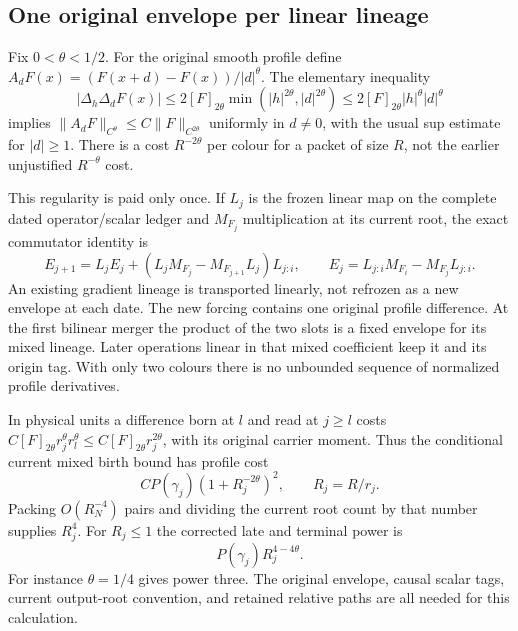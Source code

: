 \subsection{One original envelope per linear lineage}

Fix $0<\theta<1/2$.  For the original smooth profile define
$A_dF(x)=(F(x+d)-F(x))/|d|^\theta$.  The elementary inequality
\begin{equation}
 |\Delta_h\Delta_dF(x)|\leq
 2[F]_{2\theta}\min(|h|^{2\theta},|d|^{2\theta})
 \leq2[F]_{2\theta}|h|^\theta|d|^\theta
 \label{ha:holder-double}
\end{equation}
implies $\|A_dF\|_{C^\theta}\leq C\|F\|_{C^{2\theta}}$ uniformly in
$d\ne0$, with the usual sup estimate for $|d|\geq1$.  There is a cost
$R^{-2\theta}$ per colour for a packet of size $R$, not the earlier
unjustified $R^{-\theta}$ cost.

This regularity is paid only once.  If $L_j$ is the frozen linear map on
the complete dated operator/scalar ledger and $M_{F_j}$ multiplication
at its current root, the exact commutator identity is
\begin{equation}
 E_{j+1}=L_jE_j+
       (L_jM_{F_j}-M_{F_{j+1}}L_j)L_{j:i},
 \qquad E_j=L_{j:i}M_{F_i}-M_{F_j}L_{j:i}.
 \label{ha:fixed-lineage}
\end{equation}
An existing gradient lineage is transported linearly, not refrozen as a
new envelope at each date.  The new forcing contains one original
profile difference.  At the first bilinear merger the product of the
two slots is a fixed envelope for its mixed lineage.  Later operations
linear in that mixed coefficient keep it and its origin tag.  With
only two colours there is no unbounded sequence of normalized profile
derivatives.

In physical units a difference born at $l$ and read at $j\geq l$ costs
$C[F]_{2\theta}r_j^\theta r_l^\theta
\leq C[F]_{2\theta}r_j^{2\theta}$, with its original carrier moment.
Thus the conditional current mixed birth bound has profile cost
\begin{equation}
 C P(\gamma_j)(1+R_j^{-2\theta})^2,\qquad R_j=R/r_j.
 \label{ha:profile-cost}
\end{equation}
Packing $O(R_N^{-4})$ pairs and dividing the current root count by that
number supplies $R_j^4$.  For $R_j\leq1$ the corrected late and terminal
power is
\begin{equation}
             P(\gamma_j)R_j^{4-4\theta}.
 \label{ha:packing-correct}
\end{equation}
For instance $\theta=1/4$ gives power three.  The original envelope,
causal scalar tags, current output-root convention, and retained relative
paths are all needed for this calculation.

